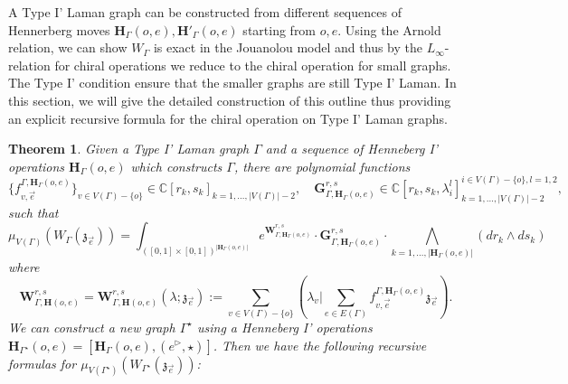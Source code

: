 \documentclass[11pt]{amsart}
\newtheorem{thm}{Theorem}[section]
\theoremstyle{definition}
\theoremstyle{remark}
\numberwithin{equation}{section}
\begin{document}
A Type I' Laman graph can be constructed from different sequences of Hennerberg moves $\mathbf{H}_{\Gamma}(o,e),
\mathbf{H}'_{\Gamma}(o,e)$ starting from $o, e$. 
Using the Arnold relation, we can show $W_{\Gamma}$ is exact in the
Jouanolou model and thus by the $L_{\infty}$-relation for chiral operations we reduce to the chiral operation for small
graphs. 
The Type I' condition ensure that the smaller graphs are still Type I' Laman. 
In this section, we will give the detailed construction of this outline thus providing an explicit recursive formula for the chiral operation on Type I' Laman graphs.

\begin{thm}\label{MainTheoremRecursiveRS}
Given a Type I' Laman graph $\Gamma$ and a sequence of Henneberg I' operations $\mathbf{H}_{\Gamma}(o,e)$ which constructs $\Gamma$, there are polynomial functions $$
\{f^{\Gamma,\mathbf{H}_{\Gamma}(o,e)}_{v,\vec{e}}\}_{v\in V(\Gamma)-\{o\}}\in \mathbb{C}[r_k,s_k]_{k=1,\dots,|V(\Gamma)|-2},\quad \mathbf{G}^{r,s}_{\Gamma,\mathbf{H}_{\Gamma}(o,e)}\in \mathbb{C}[r_k,s_k,\lambda^l_i]^{i\in V(\Gamma)-\{o\},l=1,2}_{k=1,\dots,|V(\Gamma)|-2},$$
  such that
$$
\mu_{V(\Gamma)}\left(W_{\Gamma}(\mathfrak{z}_{\vec{e}})\right)=\int_{([0,1]\times[0,1])^{|\mathbf{H}_{\Gamma}(o,e)|}}e^{\mathbf{W}^{r,s}_{\Gamma,\mathbf{H}_{\Gamma}(o,e)}}\cdot \mathbf{G}^{r,s}_{\Gamma,\mathbf{H}_{\Gamma}(o,e)}\cdot \bigwedge_{k=1,\dots,|\mathbf{H}_{\Gamma}(o,e)|} (dr_k\wedge ds_k)
$$
where
$$
    \mathbf{W}^{r,s}_{\Gamma,\mathbf{H}(o,e)}=\mathbf{W}^{r,s}_{\Gamma,\mathbf{H}(o,e)}(\lambda;\mathfrak{z}_{\vec{e}}):=\sum_{v\in V(\Gamma)-\{o\}}(\lambda_v|\sum_{e\in E(\Gamma)}f^{\Gamma,\mathbf{H}_{\Gamma}(o,e)}_{v,\vec{e}}\mathfrak{z}_{\vec{e}}).
$$
We can construct a new graph $\Gamma^{\star}$ using a Henneberg I' operations $\mathbf{H}_{\Gamma^{\star}}(o,e)=[\mathbf{H}_{\Gamma}(o,e),(e^\triangleright,\star)]$. Then we have the following recursive formulas for $\mu_{V(\Gamma^{\star})}\left(W_{\Gamma^{\star}}(\mathfrak{z}_{\vec{e}})\right)$:


\end{thm}
\end{document}
